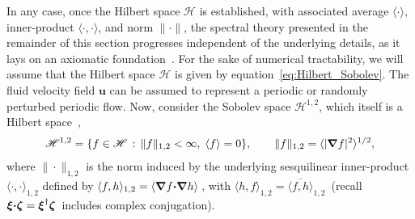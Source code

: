 \documentclass[english,12pt,jmp,graphicx]{revtex4-1}
\newcommand{\vecu}{\boldsymbol{u}}
\newcommand{\vecxi}{\boldsymbol{\xi}}
\newcommand{\veczeta}{\boldsymbol{\zeta}}
\newcommand{\bnabla}{\mbox{\boldmath${\nabla}$}}
\newcommand{\bcdot}{\mbox{\boldmath${\cdot}$}}
\newcommand{\Hs}{\mathscr{H}}
\begin{document}
In any case, once the Hilbert space $\Hs$ is established, with
associated average $\langle\cdot\rangle$, inner-product
$\langle\cdot,\cdot\rangle$, and norm $\|\cdot\|$, the 
spectral theory presented in the remainder of this section progresses
independent of the underlying details, as it lays on an axiomatic
foundation~\cite{Stone:64}. For the sake of numerical 
tractability, we will assume that the Hilbert space
$\Hs$ is given by equation~\eqref{eq:Hilbert_Sobolev}. The fluid
velocity field $\vecu$ can be assumed to represent a periodic or
randomly perturbed periodic flow. Now, consider the Sobolev space
$\Hs^{1,2}$, which itself is a Hilbert 
space~\cite{Bhattacharya:AAP:1999:951,Bhattacharya:1989:ASD},      
%
\begin{align}\label{eq:Sobolev}
  \Hs^{1,2}=\{f\in\Hs\,:\,\|f\|_{1,2}<\infty,\; \langle f\rangle=0\},  \qquad
  \|f\|_{1,2}=\langle|\bnabla f|^2\rangle^{1/2},
\end{align}
%
where $\|\cdot\|_{1,2}$ is the norm induced by the underlying sesquilinear
inner-product $\langle\cdot,\cdot\rangle_{1,2}$ defined by
$\langle f,h\rangle_{1,2}=\langle\bnabla f\bcdot\bnabla h\rangle\,$, with
$\langle h,f\rangle_{1,2}=\overline{\langle f,h\rangle}_{1,2}\,$
(recall $\vecxi\bcdot\veczeta=\vecxi^\dagger\veczeta\,$ includes
complex conjugation).  
\end{document}
